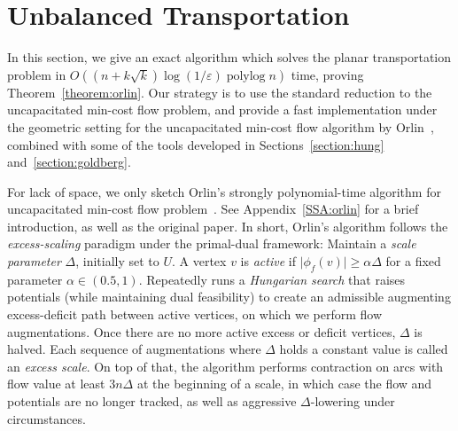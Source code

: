 \documentclass[a4paper,UKenglish]{socg-lipics-v2018}
\def\polylog{\mathop{\mathrm{polylog}}}
\def\eps{\varepsilon}
\def\abs#1{\mathopen| #1 \mathclose|}		%
\def\norm#1{\mathopen\| #1 \mathclose\|}	%
\def\tsupply{\lambda}
\def\fsupply{\phi}
\def\arcto{\mathord\shortrightarrow}
\def\arc#1#2{#1\arcto#2}
\def\cost{\operatorname{cost}}
\theoremstyle{plain}
\numberwithin{figure}{section}
\def\EMPH#1{\textcolor{BrickRed}{{\emph{#1}}}}
\begin{document}
\section{Unbalanced Transportation}
\label{section:orlin}

In this section, we give an exact algorithm which solves the planar transportation
problem in $O((n + k\sqrt{k})\log(1/\eps)\polylog n)$ time, proving Theorem~\ref{theorem:orlin}.
Our strategy is to use the standard reduction to the uncapacitated
min-cost flow problem, and provide a fast implementation under the geometric setting for the uncapacitated min-cost flow algorithm by Orlin~\cite{O93}, combined with some of the tools developed in Sections~\ref{section:hung} and~\ref{section:goldberg}.



For lack of space, we only sketch Orlin's strongly polynomial-time algorithm for uncapacitated min-cost flow problem~\cite{O93}.
See Appendix~\ref{SSA:orlin} for a brief introduction, as well as the original paper.
%
In short, Orlin's algorithm follows the \EMPH{excess-scaling} paradigm under the primal-dual framework:
Maintain a \EMPH{scale parameter} $\Delta$, initially set to $U$.
A vertex $v$ is \EMPH{active} if $\abs{\fsupply_f(v)} \geq \alpha\Delta$ for a fixed parameter $\alpha \in (0.5, 1)$.
Repeatedly runs a \emph{Hungarian search} that raises potentials (while maintaining dual
feasibility) to create an admissible augmenting excess-deficit path between active vertices, on which
we perform flow augmentations.
Once there are no more active excess or deficit vertices, $\Delta$ is halved.
Each sequence of augmentations where $\Delta$ holds a constant value is called
an \EMPH{excess scale}.
On top of that, the algorithm performs contraction on arcs with flow value at least $3n\Delta$ at the beginning of a scale, in which case the flow and potentials are no longer tracked, as well as aggressive $\Delta$-lowering under circumstances.
\end{document}
